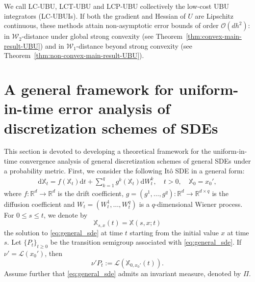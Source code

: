 \documentclass[12pt]{article}
\numberwithin{equation}{section}
\begin{document}
We call LC-UBU, LCT-UBU and LCP-UBU collectively the low-cost
UBU integrators (LC-UBUIs). If both the gradient and Hessian of
$U$ are Lipschitz continuous, these methods attain
non-asymptotic error bounds of order $\mathcal O(dh^2)$: in 
$\mathcal W_2$-distance under global strong convexity
(see Theorem~\ref{thm:convex-main-result-UBU}) and in
$\mathcal W_1$-distance beyond strong convexity (see Theorem~\ref{thm:non-convex-main-result-UBU}).




\section{A general framework for uniform-in-time error analysis of discretization schemes of SDEs}
\label{sec:framework}

This section is devoted to developing a theoretical framework for the uniform-in-time convergence analysis of general discretization schemes of general SDEs under a probability metric. 
%
First, we consider the following Itô SDE in a general form:
\begin{align}\label{eq:general_sde}
    \mathrm{d}\mathbb{X}_t = f\left(\mathbb{X}_t\right)\mathrm{d}t + \sum_{k=1}^{q} g^k\left(\mathbb{X}_t\right)\mathrm{d}W_t^k,
    \quad
    t >  0,
    \quad
    \mathbb{X}_0 = x_0',
\end{align}
where \( f \colon \mathbb{R}^d \to \mathbb{R}^d \) is the drift coefficient,
\( g=(g^1,\ldots,g^q) \colon \mathbb{R}^d \to \mathbb{R}^{d\times q} \) is the diffusion coefficient  and
\( W_t=(W_t^1,\ldots,W_t^q) \) is a \(q\)-dimensional Wiener process.
%
For \(0\le s\le t\), we denote by
\[
    \mathbb{X}_{s,x}(t)
    =
    \mathbb{X}(s,x;t)
\]
the solution to \eqref{eq:general_sde} at time \(t\) starting from the initial value
\(x\) at time \(s\). Let \(\{P_t\}_{t\ge0}\) be the transition semigroup associated
with \eqref{eq:general_sde}. 
If \(\nu'=\mathcal{L}(x_0')\), then
\[
    \nu'P_t := \mathcal{L}(\mathbb{X}_{0,x_0'}(t)).
\]
Assume further that \eqref{eq:general_sde} admits an invariant measure, denoted by $\Pi$.
\end{document}
